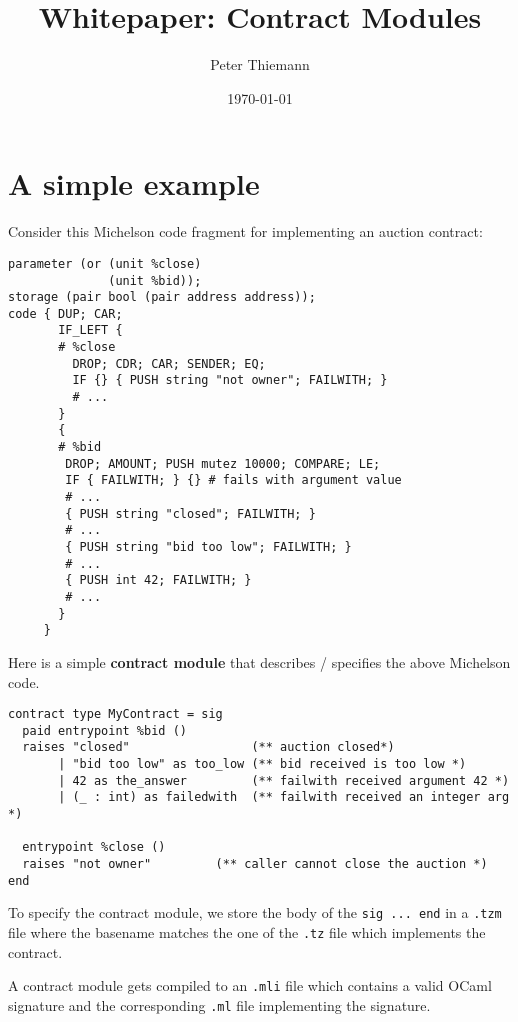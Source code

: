 \documentclass[a4paper]{llncs}
\title{Whitepaper: Contract Modules}
\author{Peter Thiemann}
\institute{}
\date{\today}
\begin{document}
\maketitle
\pagestyle{plain}

\section{A simple example}
\label{sec:motivation}


Consider this Michelson code fragment for implementing an auction contract:
\begin{lstlisting}[language=michelson,caption={Michelson code example},label={lst:code-example}]
parameter (or (unit %close)
              (unit %bid));
storage (pair bool (pair address address));
code { DUP; CAR; 
       IF_LEFT {
       # %close
         DROP; CDR; CAR; SENDER; EQ;
         IF {} { PUSH string "not owner"; FAILWITH; }
         # ...
       }
       {
       # %bid
        DROP; AMOUNT; PUSH mutez 10000; COMPARE; LE;
        IF { FAILWITH; } {} # fails with argument value
        # ...
        { PUSH string "closed"; FAILWITH; }
        # ...
        { PUSH string "bid too low"; FAILWITH; }
        # ...
        { PUSH int 42; FAILWITH; }
        # ...
       }
     }
\end{lstlisting}

Here is a simple \textbf{contract module} that describes / specifies
the above Michelson code. 
\begin{lstlisting}[caption={Contract module example},label={lst:contract-module-example}]
contract type MyContract = sig
  paid entrypoint %bid () 
  raises "closed"                 (** auction closed*)
       | "bid too low" as too_low (** bid received is too low *)
       | 42 as the_answer         (** failwith received argument 42 *)
       | (_ : int) as failedwith  (** failwith received an integer arg *)

  entrypoint %close ()
  raises "not owner"         (** caller cannot close the auction *)
end
\end{lstlisting}

To specify the contract module, we store
the body of the \lstinline/sig ... end/ in a
\texttt{.tzm} file where the basename matches the one of the
\texttt{.tz} file which implements the contract.

A contract module gets compiled to an \texttt{.mli} file which contains a
valid OCaml signature and the corresponding \texttt{.ml} file
implementing the signature. 
\end{document}
